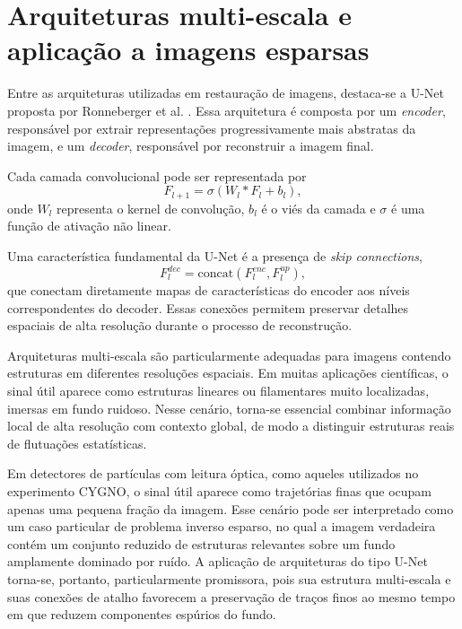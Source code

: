 \documentclass[
        oneside,      %
        english,			
        brazil			 
        ]{abntbibufjf}
\begin{document}
\section{Arquiteturas multi-escala e aplicação a imagens esparsas}

Entre as arquiteturas utilizadas em restauração de imagens, destaca-se a U-Net proposta por Ronneberger et al. \cite{ronneberger2015unet}. Essa arquitetura é composta por um \textit{encoder}, responsável por extrair representações progressivamente mais abstratas da imagem, e um \textit{decoder}, responsável por reconstruir a imagem final.

Cada camada convolucional pode ser representada por
\begin{equation}
F_{l+1}
=
\sigma(W_l * F_l + b_l),
\end{equation}
onde $W_l$ representa o kernel de convolução, $b_l$ é o viés da camada e $\sigma$ é uma função de ativação não linear.

Uma característica fundamental da U-Net é a presença de \textit{skip connections},
\begin{equation}
F_l^{dec}
=
\mathrm{concat}(F_l^{enc},F_l^{up}),
\end{equation}
que conectam diretamente mapas de características do encoder aos níveis correspondentes do decoder. Essas conexões permitem preservar detalhes espaciais de alta resolução durante o processo de reconstrução.

Arquiteturas multi-escala são particularmente adequadas para imagens contendo estruturas em diferentes resoluções espaciais. Em muitas aplicações científicas, o sinal útil aparece como estruturas lineares ou filamentares muito localizadas, imersas em fundo ruidoso. Nesse cenário, torna-se essencial combinar informação local de alta resolução com contexto global, de modo a distinguir estruturas reais de flutuações estatísticas.

Em detectores de partículas com leitura óptica, como aqueles utilizados no experimento CYGNO, o sinal útil aparece como trajetórias finas que ocupam apenas uma pequena fração da imagem. Esse cenário pode ser interpretado como um caso particular de problema inverso esparso, no qual a imagem verdadeira contém um conjunto reduzido de estruturas relevantes sobre um fundo amplamente dominado por ruído. A aplicação de arquiteturas do tipo U-Net torna-se, portanto, particularmente promissora, pois sua estrutura multi-escala e suas conexões de atalho favorecem a preservação de traços finos ao mesmo tempo em que reduzem componentes espúrios do fundo.
\end{document}
